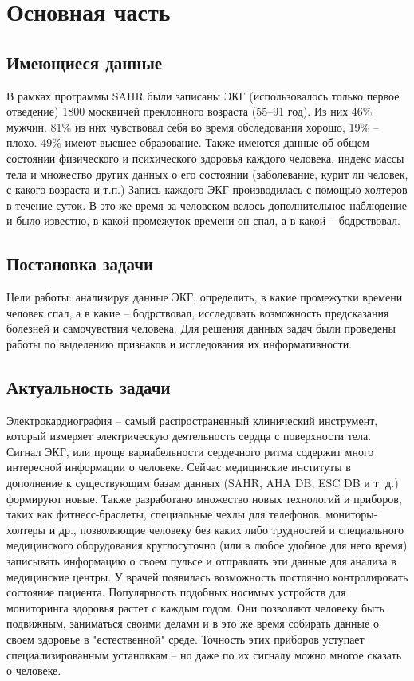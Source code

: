 \chapter{Основная часть}
\section{Имеющиеся данные}
В рамках программы SAHR были записаны ЭКГ (использовалось только первое отведение) 1800 москвичей преклонного возраста (55--91 год). Из них 46\% мужчин. 81\% из них чувствовал себя во время обследования хорошо, 19\% -- плохо. 49\% имеют высшее образование. Также имеются данные об общем состоянии физического и психического здоровья каждого человека, индекс массы тела и множество других данных о его состоянии (заболевание, курит ли человек, с какого возраста и т.п.) Запись каждого ЭКГ производилась с помощью холтеров в течение суток. В это же время за человеком велось дополнительное наблюдение и было известно, в какой промежуток времени он спал, а в какой -- бодрствовал.
\section{Постановка задачи}

Цели работы: анализируя данные ЭКГ, определить, в какие промежутки времени человек спал, а в какие -- бодрствовал, исследовать возможность предсказания болезней и самочувствия человека. 
Для решения данных задач были проведены работы по выделению признаков и исследования их информативности.

\section{Актуальность задачи}
Электрокардиография -- самый распространенный клинический инструмент, который измеряет электрическую деятельность сердца с поверхности тела. Сигнал ЭКГ, или проще вариабельности сердечного ритма содержит много интересной информации о человеке. Сейчас медицинские институты в дополнение к существующим базам данных (SAHR, AHA DB, ESC DB и т. д.) формируют новые. Также разработано множество новых технологий и приборов, таких как фитнесс-браслеты, специальные чехлы для телефонов, мониторы-холтеры и др., позволяющие человеку без каких либо трудностей и специального медицинского оборудования круглосуточно (или в любое удобное для него время) записывать информацию о своем пульсе и отправлять эти данные  для анализа в медицинские центры. У врачей появилась возможность постоянно контролировать состояние пациента. Популярность подобных носимых устройств для мониторинга здоровья растет с каждым годом. Они позволяют человеку быть подвижным, заниматься своими делами и в это же время собирать данные о своем здоровье в "естественной" среде. Точность этих приборов уступает специализированным установкам -- но даже по их сигналу можно многое сказать о человеке. 

